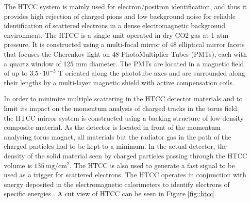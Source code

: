     The HTCC system is mainly used for electron/positron identification, and thus it provides high rejection of charged pions and low background noise for reliable identification of scattered electrons in a dense electromagnetic background environment.
    The HTCC is a single unit operated in dry CO2 gas at 1 atm pressure.
    It is constructed using a multi-focal mirror of 48 elliptical mirror facets that focuses the Cherenkov light on 48 PhotoMultiplier Tubes (PMTs), each with a quartz window of 125 mm diameter.
    The PMTs are located in a magnetic field of up to $3.5\cdot 10^{-3}$ T oriented along the phototube axes and are surrounded along their lengths by a multi-layer magnetic shield with active compensation coils.

    In order to minimize multiple scattering in the HTCC detector materials and to limit its impact on the momentum analysis of charged tracks in the torus field, the HTCC mirror system is constructed using a backing structure of low-density composite material.
    As the detector is located in front of the momentum analysing torus magnet, all materials but the radiator gas in the path of the charged particles had to be kept to a minimum.
    In the actual detector, the density of the solid material seen by charged particles passing through the HTCC volume is $135 ~\text{mg}/\text{cm}^2$.
    The HTCC is also used to generate a fast signal to be used as a trigger for scattered electrons.
    The HTCC operates in conjunction with energy deposited in the electromagnetic calorimeters to identify electrons of specific energies \cite{sharabian2020}.
    A cut view of HTCC can be seen in Figure \ref{fig::htcc}.

